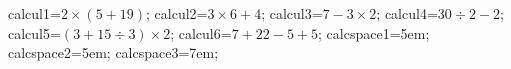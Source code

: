 \documentclass[exercice]{thedocument}%
\begin{document}
%
\>calcul1=$2\times(5+19)$;%
\>calcul2=$3\times6+4$;%
\>calcul3=$7-3\times2$;%
\>calcul4=$30\div2-2$;%
\>calcul5=$(3+15\div3)\times2$;%
\>calcul6=$7+22-5+5$;%
\>calcspace1=5em;%
\>calcspace2=5em;%
\>calcspace3=7em;%
%
\end{document}
